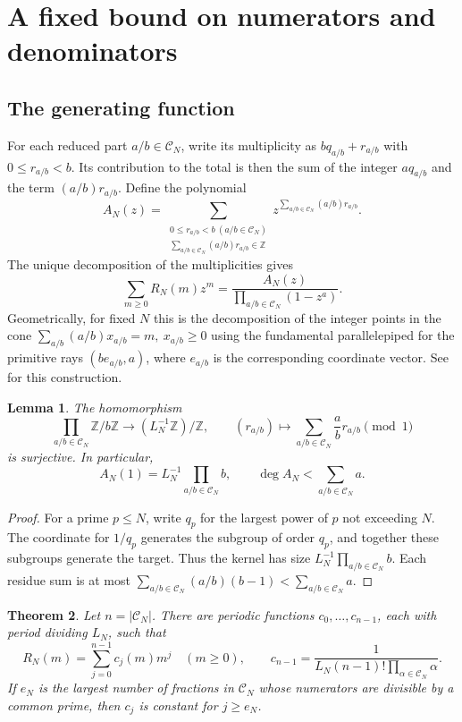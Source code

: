 \documentclass[11pt]{amsart}
\newtheorem{theorem}{Theorem}[section]
\newtheorem{lemma}[theorem]{Lemma}
\theoremstyle{remark}
\newcommand{\Z}{\mathbb Z}
\newcommand{\CN}{\mathcal C_N}
\begin{document}
\section{A fixed bound on numerators and denominators}\label{sec:residue}

\subsection{The generating function}

For each reduced part $a/b\in\mathcal C_N$, write its multiplicity as $bq_{a/b}+r_{a/b}$ with $0\le r_{a/b}<b$. Its contribution to the total is then the sum of the integer $aq_{a/b}$ and the term $(a/b)r_{a/b}$. Define the polynomial
\[
 A_N(z)=\sum_{\substack{0\le r_{a/b}< b\ (a/b\in\mathcal C_N)\\
                        \sum_{a/b\in\mathcal C_N}(a/b)r_{a/b}\in\mathbb Z}}
 z^{\sum_{a/b\in\mathcal C_N}(a/b)r_{a/b}}.
\]
The unique decomposition of the multiplicities gives
\begin{equation}\label{eq:residue-numerator}
 \sum_{m\ge0}R_N(m)z^m=
 \frac{A_N(z)}{\displaystyle\prod_{a/b\in\mathcal C_N}(1-z^a)}.
\end{equation}
Geometrically, for fixed \(N\) this is the decomposition of the integer
points in the cone \(\sum_{a/b}(a/b)x_{a/b}=m,\ x_{a/b}\ge0\)
using the fundamental parallelepiped for the primitive rays
\((b e_{a/b},a)\), where \(e_{a/b}\) is the corresponding coordinate
vector. See \cite[Theorem~3.5]{beck-robins} for this construction.

\begin{lemma}\label{lem:residue-map}
The homomorphism
\[
 \prod_{a/b\in\CN}\Z/b\Z \longrightarrow (L_N^{-1}\Z)/\Z,\qquad
 (r_{a/b})\longmapsto\sum_{a/b\in\CN}\frac ab r_{a/b}\pmod 1
\]
is surjective. In particular,
\[
 A_N(1)=L_N^{-1}\prod_{a/b\in\CN}b,\qquad
 \deg A_N<\sum_{a/b\in\CN}a .
\]
\end{lemma}

\begin{proof}
For a prime \(p\le N\), write \(q_p\) for the largest power of \(p\) not exceeding \(N\). The coordinate for \(1/q_p\) generates the subgroup of order \(q_p\), and together these subgroups generate the target. Thus the kernel has size \(L_N^{-1}\prod_{a/b\in\CN}b\). Each residue sum is at most \(\sum_{a/b\in\CN}(a/b)(b-1)<\sum_{a/b\in\CN}a\).
\end{proof}

\begin{theorem}\label{thm:quasipolynomial}
Let \(n=|\CN|\). There are periodic functions \(c_0,\ldots,c_{n-1}\), each with period dividing \(L_N\), such that
\[
 R_N(m)=\sum_{j=0}^{n-1}c_j(m)m^j\quad(m\ge0),
 \qquad
 c_{n-1}=\frac1{L_N(n-1)!\prod_{\alpha\in\CN}\alpha}.
\]
If \(e_N\) is the largest number of fractions in \(\CN\) whose numerators are divisible by a common prime, then \(c_j\) is constant for \(j\ge e_N\).
\end{theorem}
\end{document}
